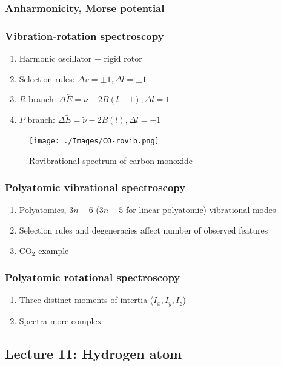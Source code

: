 \documentclass[11pt]{article}
\begin{document}
\subsubsection{Anharmonicity, Morse potential}
\label{sec:orgfb1579b}
\subsubsection{Vibration-rotation spectroscopy}
\label{sec:orgcd9077a}
\begin{enumerate}
\item Harmonic oscillator + rigid rotor
\item Selection rules: \(\Delta v = \pm 1, \Delta l=\pm 1\)
\item \(R\) branch: \(\Delta \tilde E  = \tilde \nu + 2B(l+1), \Delta l = 1\)
\item \(P\) branch: \(\Delta \tilde E = \tilde \nu - 2B(l), \Delta l = -1\)
\end{enumerate}
\begin{figure}[htbp]
\centering
\texttt{[image: ./Images/CO-rovib.png]}
\caption{Rovibrational spectrum of carbon monoxide}
\end{figure}
\subsubsection{Polyatomic vibrational spectroscopy}
\label{sec:org55d8512}
\begin{enumerate}
\item Polyatomics, \(3n-6\) (\(3n-5\) for linear polyatomic) vibrational modes
\item Selection rules and degeneracies affect number of observed features
\item CO\(_2\) example
\end{enumerate}
\subsubsection{Polyatomic rotational spectroscopy}
\label{sec:org0f41507}
\begin{enumerate}
\item Three distinct moments of intertia (\(I_x, I_y, I_z\))
\item Spectra more complex
\end{enumerate}
\subsection{Lecture 11: Hydrogen atom}
\label{sec:org31a21f5}
\end{document}
